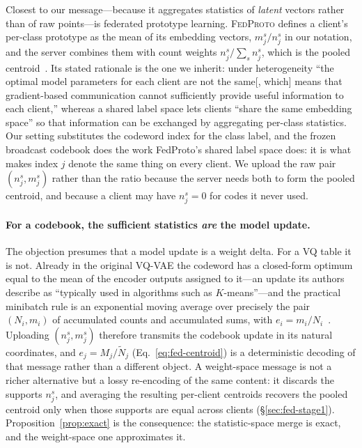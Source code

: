 Closest to our message---because it aggregates statistics of \emph{latent} vectors rather
than of raw points---is federated prototype learning. \textsc{FedProto} defines a client's
per-class prototype as the mean of its embedding vectors, $m^{s}_{j}/n^{s}_{j}$ in our
notation, and the server combines them with count weights $n^{s}_{j}/\sum_s n^{s}_{j}$,
which is the pooled centroid~\cite[Eqs.~3,~6]{tan2022fedproto}. Its stated rationale is
the one we inherit: under heterogeneity ``the optimal model parameters for each client are
not the same[, which] means that gradient-based communication cannot sufficiently provide
useful information to each client,'' whereas a shared label space lets clients ``share the
same embedding space'' so that information can be exchanged by aggregating per-class
statistics. Our setting substitutes the codeword index for the class label, and the frozen
broadcast codebook does the work FedProto's shared label space does: it is what makes index
$j$ denote the same thing on every client. We upload the raw pair $(n^{s}_{j}, m^{s}_{j})$
rather than the ratio because the server needs both to form the pooled centroid, and
because a client may have $n^{s}_{j}=0$ for codes it never used.

\paragraph{For a codebook, the sufficient statistics \emph{are} the model update.}
The objection presumes that a model update is a weight delta. For a VQ table it is not.
Already in the original VQ-VAE the codeword has a closed-form optimum equal to the mean of
the encoder outputs assigned to it---an update its authors describe as ``typically used in
algorithms such as $K$-means''---and the practical minibatch rule is an exponential moving
average over precisely the pair $(N_i, m_i)$ of accumulated counts and accumulated sums,
with $e_i = m_i/N_i$~\cite[App.~A.1]{van_den_oord2017neural}. Uploading $(n^{s}_{j}, m^{s}_{j})$
therefore transmits the codebook update in its natural coordinates, and
$e_j = M_j/\tilde N_j$ (Eq.~\ref{eq:fed-centroid}) is a deterministic decoding of that
message rather than a different object. A weight-space message is not a richer alternative
but a lossy re-encoding of the same content: it discards the supports $n^{s}_{j}$, and
averaging the resulting per-client centroids recovers the pooled centroid only when those
supports are equal across clients (\S\ref{sec:fed-stage1}). Proposition~\ref{prop:exact} is
the consequence: the statistic-space merge is exact, and the weight-space one approximates it.

